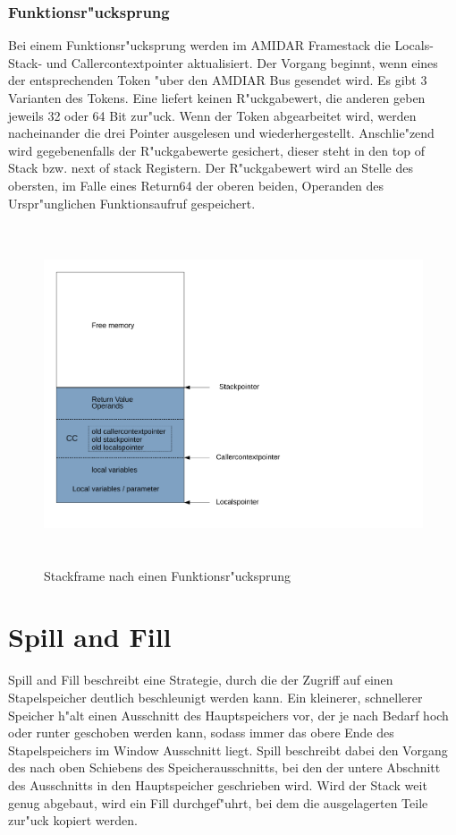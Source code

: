 \subsubsection{Funktionsr"ucksprung}

Bei einem Funktionsr"ucksprung werden im AMIDAR Framestack die Locals- Stack- und Callercontextpointer aktualisiert. Der Vorgang beginnt, wenn eines der entsprechenden Token "uber den AMDIAR Bus gesendet wird. Es gibt 3 Varianten des Tokens. Eine liefert keinen R"uckgabewert, die anderen geben jeweils 32 oder 64 Bit zur"uck. Wenn der Token abgearbeitet wird, werden nacheinander die drei Pointer ausgelesen und wiederhergestellt. Anschlie"zend wird gegebenenfalls der R"uckgabewerte gesichert, dieser steht in den top of Stack bzw. next of stack Registern. Der R"uckgabewert wird an Stelle des obersten, im Falle eines Return64 der oberen beiden, Operanden des Urspr"unglichen Funktionsaufruf gespeichert. \cite{Illy}

\begin{figure}[H]
	\centering
	\includegraphics[height = 10cm]{PS_RS_graphics/Stackframeafterreturn.pdf}
	\caption{Stackframe nach einen Funktionsr"ucksprung}
\end{figure}
\section{Spill and Fill}

Spill and Fill beschreibt eine Strategie, durch die der Zugriff auf einen Stapelspeicher deutlich beschleunigt werden kann. Ein kleinerer, schnellerer Speicher h"alt einen Ausschnitt des Hauptspeichers vor, der je nach Bedarf hoch oder runter geschoben werden kann, sodass immer das obere Ende des Stapelspeichers im Window Ausschnitt liegt. Spill beschreibt dabei den Vorgang des nach oben Schiebens des Speicherausschnitts, bei den der untere Abschnitt des Ausschnitts in den Hauptspeicher geschrieben wird. Wird der Stack weit genug abgebaut, wird ein Fill durchgef"uhrt, bei dem die ausgelagerten Teile zur"uck kopiert werden.  

